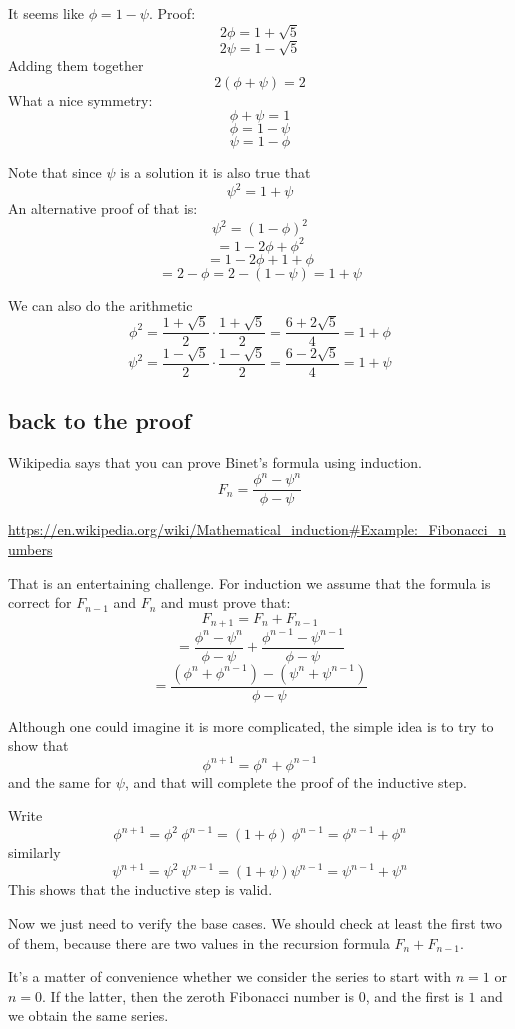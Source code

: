 \documentclass[11pt, oneside]{article}
\begin{document}
It seems like $\phi = 1 - \psi$.  Proof:
\[ 2 \phi = 1 + \sqrt{5} \]
\[ 2 \psi = 1 - \sqrt{5} \]
Adding them together
\[ 2(\phi + \psi) = 2 \]
What a nice symmetry:
\[ \phi + \psi = 1 \]
\[ \phi = 1 - \psi \]
\[ \psi = 1 - \phi \]

Note that since $\psi$ is a solution it is also true that
\[ \psi^2 = 1 + \psi \]
An alternative proof of that is:
\[ \psi^2 = (1 - \phi)^2 \]
\[ = 1 - 2 \phi + \phi^2 \]
\[ = 1 - 2\phi + 1 + \phi \]
\[ = 2 - \phi = 2 - (1 - \psi) = 1 + \psi  \]

We can also do the arithmetic
\[ \phi^2 = \frac{1 + \sqrt{5}}{2} \cdot \frac{1 + \sqrt{5}}{2} = \frac{6 + 2 \sqrt{5}}{4} = 1 + \phi \]
\[ \psi^2 = \frac{1 - \sqrt{5}}{2} \cdot \frac{1 - \sqrt{5}}{2} = \frac{6 - 2 \sqrt{5}}{4} = 1 + \psi \]

\subsection*{back to the proof}
Wikipedia says that you can prove Binet's formula using induction.
\[ F_n = \frac{\phi^n - \psi^n}{\phi - \psi} \]

\url{https://en.wikipedia.org/wiki/Mathematical_induction#Example:_Fibonacci_numbers}

That is an entertaining challenge.  For induction we assume that the formula is correct for $F_{n-1}$ and $F_n$ and must prove that:
\[ F_{n+1} = F_n + F_{n-1} \]
\[ = \frac{\phi^n - \psi^n}{\phi - \psi} + \frac{\phi^{n-1} - \psi^{n-1}}{\phi - \psi} \]
\[ = \frac{(\phi^n + \phi^{n-1}) - (\psi^{n} + \psi^{n-1})}{\phi - \psi} \]

Although one could imagine it is more complicated, the simple idea is to try to show that
\[ \phi^{n+1} = \phi^n + \phi^{n-1} \]
and the same for $\psi$, and that will complete the proof of the inductive step.

Write
\[ \phi^{n+1} = \phi^2 \ \phi^{n - 1} = (1 + \phi) \ \phi^{n - 1} = \phi^{n-1} + \phi^n  \]
similarly
\[ \psi^{n+1} = \psi^2 \ \psi^{n - 1} = (1 + \psi)\psi^{n-1} = \psi^{n-1} + \psi^n \]
This shows that the inductive step is valid.

Now we just need to verify the base cases.  We should check at least the first two of them, because there are two values in the recursion formula $F_{n} + F_{n-1}$.

It's a matter of convenience whether we consider the series to start with $n=1$ or $n=0$.  If the latter, then the zeroth Fibonacci number is $0$, and the first is $1$ and we obtain the same series.
\end{document}

